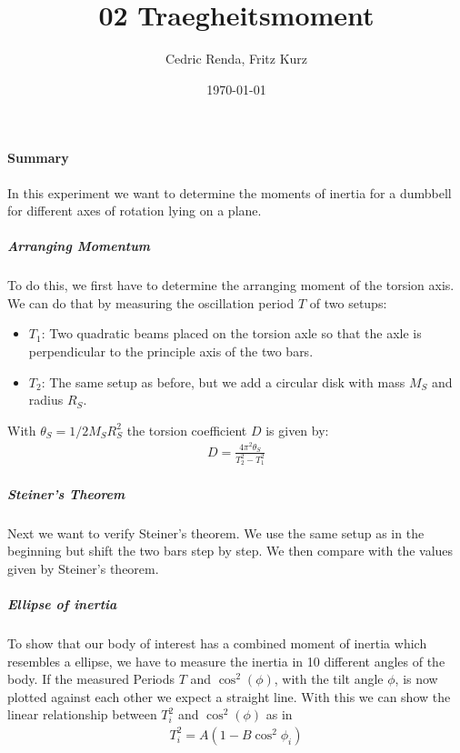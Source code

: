 \documentclass[12pt,a4paper]{article}
\title{02 Traegheitsmoment}
\author{Cedric Renda, Fritz Kurz}
\date{\today }
\begin{document}
	
\maketitle
\paragraph{Summary}
In this experiment we want to determine the moments of inertia for a dumbbell for different axes of rotation lying on a plane.

\subparagraph{Arranging Momentum}
To do this, we first have to determine the arranging moment of the torsion axis.
We can do that by measuring the oscillation period $T$ of two setups:
\begin{itemize}
	\item $T_1$: Two quadratic beams placed on the torsion axle so that the axle is perpendicular to the principle axis of the two bars.
	\item $T_2$: The same setup as before, but we add a circular disk with mass $M_S$ and radius $R_S$.
\end{itemize}
With $\theta_S = 1/2 M_S R_S^2$ the torsion coefficient $D$ is given by:
\begin{align*}
	D = \frac{4 \pi^2 \theta_S}{T_2^2 - T_1^2}
\end{align*}

\subparagraph{Steiner's Theorem}
Next we want to verify Steiner's theorem.
We use the same setup as in the beginning but shift the two bars step by step. We then compare with the values given by Steiner's theorem.

\subparagraph{Ellipse of inertia}
To show that our body of interest has a combined moment of inertia which resembles a ellipse, we have to measure the inertia in 10 different angles of the body.
If the measured Periods $T$ and $\cos^2 (\phi)$, with the tilt angle $\phi$, is now plotted against each other we expect a straight line.
With this we can show the linear relationship between $T_i ^2$ and $\cos^2(\phi)$ as in 
\begin{align*}
T_i^2 = A(1-B \cos^2 \phi_i)
\end{align*}

	
\end{document}

